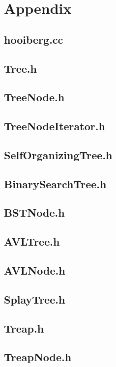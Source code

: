 \documentclass[a4paper,10pt]{article}
\begin{document}
\section{Appendix}

\subsection{hooiberg.cc}

\subsection{Tree.h}

\subsection{TreeNode.h}

\subsection{TreeNodeIterator.h}

\subsection{SelfOrganizingTree.h}

\subsection{BinarySearchTree.h}

\subsection{BSTNode.h}

\subsection{AVLTree.h}

\subsection{AVLNode.h}

\subsection{SplayTree.h}

\subsection{Treap.h}

\subsection{TreapNode.h}

\end{document}
